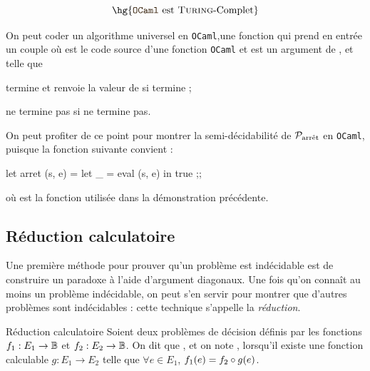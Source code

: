 \documentclass[a4paper,french,bookmarks]{book}
\newcommand{\langOcaml}{\texttt{\color{ocamlColor!20!black}OCaml}}
\begin{document}
    \begin{theorem}{}{}
        \[ \hg{\text{\langOcaml{} est \textsc{Turing}-Complet}} \]
    \end{theorem}
    \begin{nproof}
        On peut coder un algorithme universel en \langOcaml{},\ie une fonction 
        qui prend en entrée un couple  où  est le code source d'une fonction \langOcaml{}  et  est un argument de , et telle que
        \begin{enumerate}
            \itt {} termine et renvoie la valeur de  si  termine ;
            
            \itt ne termine pas si  ne termine pas.
        \end{enumerate}
    \end{nproof}
    
    On peut profiter de ce point pour montrer la semi-décidabilité de $\mathcal{P}_\text{arrêt}$ en \langOcaml{}, puisque la fonction suivante convient :
    \begin{ocaml}
let arret (s, e) =
    let _ = eval (s, e) in true
;;
    \end{ocaml}
    où  est la fonction utilisée dans la démonstration précédente.
    
    \subsection{Réduction calculatoire}
    
    Une première méthode pour prouver qu'un problème est indécidable est de construire un paradoxe à l'aide d'argument diagonaux. Une fois qu'on connaît au moins un problème indécidable, on peut s'en servir pour montrer que d'autres problèmes sont indécidables : cette technique s'appelle la \emph{réduction}.
    
    \begin{definition}{Réduction calculatoire}{}
        Soient deux problèmes de décision définis par les fonctions $f_1 : E_1 \to \mathbb{B}$ et $f_2 : E_2 \to \mathbb{B}$. On dit que , et on note , lorsqu'il existe une fonction calculable $g : E_1 \to E_2$ telle que $\forall e \in E_1$, $f_1\!\left(e\right) = f_2 \circ g\!\left(e\right)$.
    \end{definition}
    
\end{document}
